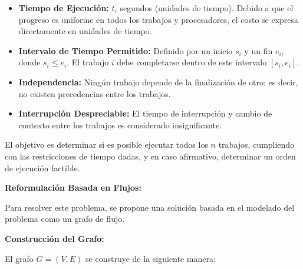 \documentclass[14pt]{extarticle}
\begin{document}
\begin{itemize}
    \item \textbf{Tiempo de Ejecución:} $t_i$ segundos (unidades de tiempo). Debido a que el progreso es uniforme en todos los trabajos y procesadores, el costo se expresa directamente en unidades de tiempo.
    \item \textbf{Intervalo de Tiempo Permitido:} Definido por un inicio $s_i$ y un fin $e_i$, donde $s_i \leq e_i$. El trabajo $i$ debe completarse dentro de este intervalo $[s_i, e_i]$.
    \item \textbf{Independencia:} Ningún trabajo depende de la finalización de otro; es decir, no existen precedencias entre los trabajos.
    \item \textbf{Interrupción Despreciable:} El tiempo de interrupción y cambio de contexto entre los trabajos es considerado insignificante.
\end{itemize}

El objetivo es determinar si es posible ejecutar todos los $n$ trabajos, cumpliendo con las restricciones de tiempo dadas, y en caso afirmativo, determinar un orden de ejecución factible.

\textbf{Reformulación Basada en Flujos:}

Para resolver este problema, se propone una solución basada en el modelado del problema como un grafo de flujo.

\textbf{Construcción del Grafo:}

El grafo $G = (V, E)$ se construye de la siguiente manera:
\end{document}
